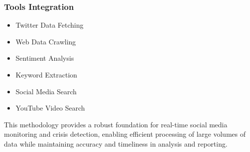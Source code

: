 \subsubsection{Tools Integration}
\begin{itemize}
    \item Twitter Data Fetching
    \item Web Data Crawling
    \item Sentiment Analysis
    \item Keyword Extraction
    \item Social Media Search
    \item YouTube Video Search
\end{itemize}

This methodology provides a robust foundation for real-time social media monitoring and crisis detection, enabling efficient processing of large volumes of data while maintaining accuracy and timeliness in analysis and reporting. 